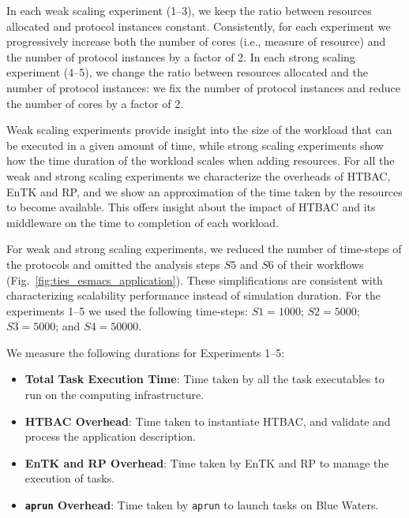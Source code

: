 
In each weak scaling experiment (1--3), we keep the ratio between resources
allocated and protocol instances constant. Consistently, for each experiment
we progressively increase both the number of cores (i.e., measure of
resource) and the number of protocol instances by a factor of 2. In each
strong scaling experiment (4--5), we change the ratio between resources
allocated and the number of protocol instances: we fix the number of protocol
instances and reduce the number of cores by a factor of 2.

Weak scaling experiments provide insight into the size of the workload that
can be executed in a given amount of time, while strong scaling experiments
show how the time duration of the workload scales when adding resources. For
all the weak and strong scaling experiments we characterize the overheads of
HTBAC, EnTK and RP, and we show an approximation of the time taken by the
resources to become available. This offers insight about the impact of HTBAC
and its middleware on the time to completion of each workload.

For weak and strong scaling experiments, we reduced the number of time-steps
of the protocols and omitted the analysis steps $S5$ and $S6$ of their
workflows (Fig.~\ref{fig:ties_esmacs_application}). These simplifications
are consistent with characterizing scalability performance instead of
simulation duration. For the experiments 1--5 we used the following
time-steps: $S1=1000$; $S2=5000$; $S3=5000$; and $S4=50000$.

We measure the following durations for Experiments 1--5:
\begin{itemize}
    \item \textbf{Total Task Execution Time}: Time taken by all the
    task executables to run on the computing infrastructure.
    \item \textbf{HTBAC Overhead}: Time taken to instantiate HTBAC, and
    validate and process the application description.
    \item \textbf{EnTK and RP Overhead}: Time taken by EnTK and RP to manage
    the execution of tasks.
    \item \textbf{\texttt{aprun} Overhead}:  Time taken by \texttt{aprun} to
    launch tasks on Blue Waters.
\end{itemize}

